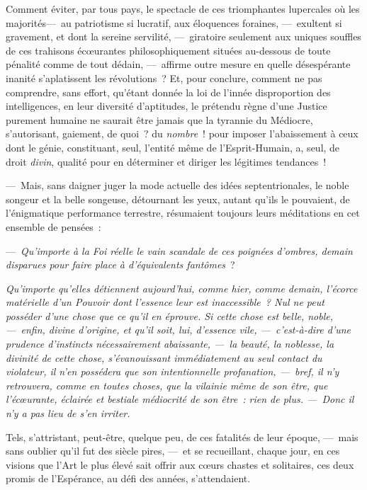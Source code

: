 \documentclass[french,twoside]{book} %
\begin{document}
Comment éviter, par tous pays, le spectacle de ces triomphantes lupercales où les majorités— au patriotisme si lucratif, aux éloquences foraines, — exultent si gravement, et dont la   sereine servilité, — giratoire seulement aux uniques souffles de ces trahisons écœurantes philosophiquement situées au-dessous de toute pénalité comme de tout dédain, — affirme outre mesure en quelle désespérante inanité s’aplatissent les révolutions ? Et, pour conclure, comment ne pas comprendre, sans effort, qu’étant donnée la loi de l’innée disproportion des intelligences, en leur diversité d’aptitudes, le prétendu règne d’une Justice purement humaine ne saurait être jamais que la tyrannie du Médiocre, s’autorisant, gaiement, de quoi ? du \emph{nombre} ! pour imposer l’abaissement à ceux dont le génie, constituant, seul, l’entité même de l’Esprit-Humain, a, seul, de droit \emph{divin}, qualité pour en déterminer et diriger les légitimes tendances !\par
— Mais, sans daigner juger la mode actuelle des idées septentrionales, le noble songeur et la belle songeuse, détournant les yeux, autant qu’ils le pouvaient, de l’énigmatique performance terrestre, résumaient toujours leurs méditations en cet ensemble de pensées :\par
— \emph{Qu’importe à la Foi réelle le vain scandale}  \emph{ de ces poignées d’ombres, demain disparues pour faire place à d’équivalents fantômes} ?\par
\emph{Qu’importe qu’elles détiennent aujourd’hui, comme hier, comme demain, l’écorce matérielle d’un Pouvoir dont l’essence leur est inaccessible ? Nul ne peut posséder d’une chose que ce qu’il en éprouve. Si cette chose est belle, noble, — enfin, divine d’origine, et qu’il soit, lui, d’essence vile, — c’est-à-dire d’une prudence d’instincts nécessairement abaissante, — la beauté, la noblesse, la divinité de cette chose, s’évanouissant immédiatement au seul contact du violateur, il n’en possédera que son intentionnelle profanation, — bref, il n’y retrouvera, comme en toutes choses, que la vilainie même de son être, que l’écœurante, éclairée et bestiale médiocrité de son être : rien de plus. — Donc il n’y a pas lieu de s’en irriter.}\par
Tels, s’attristant, peut-être, quelque peu, de ces fatalités de leur époque, — mais sans oublier qu’il fut des siècle pires, — et se recueillant, chaque jour, en ces visions que l’Art le plus élevé sait offrir aux cœurs chastes et solitaires,   ces deux promis de l’Espérance, au défi des années, s’attendaient.\par
\end{document}
